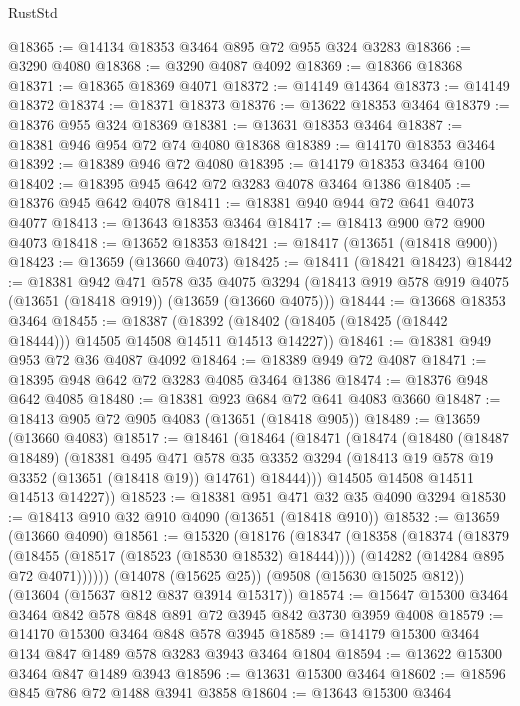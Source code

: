 \begin{lexlean}{RustStd}
\begin{coremodule}
@18365 := @14134 @18353 @3464 @895 @72 @955 @324 @3283
@18366 := @3290 @4080
@18368 := @3290 @4087 @4092
@18369 := @18366 @18368
@18371 := @18365 @18369 @4071
@18372 := @14149 @14364
@18373 := @14149 @18372
@18374 := @18371 @18373
@18376 := @13622 @18353 @3464
@18379 := @18376 @955 @324 @18369
@18381 := @13631 @18353 @3464
@18387 := @18381 @946 @954 @72 @74 @4080 @18368
@18389 := @14170 @18353 @3464
@18392 := @18389 @946 @72 @4080
@18395 := @14179 @18353 @3464 @100
@18402 := @18395 @945 @642 @72 @3283 @4078 @3464 @1386
@18405 := @18376 @945 @642 @4078
@18411 := @18381 @940 @944 @72 @641 @4073 @4077
@18413 := @13643 @18353 @3464
@18417 := @18413 @900 @72 @900 @4073
@18418 := @13652 @18353
@18421 := @18417 (@13651 (@18418 @900))
@18423 := @13659 (@13660 @4073)
@18425 := @18411 (@18421 @18423)
@18442 := @18381
    @942
    @471
    @578
    @35
    @4075
    @3294
    (@18413 @919 @578 @919 @4075 (@13651 (@18418 @919)) (@13659 (@13660 @4075)))
@18444 := @13668 @18353 @3464
@18455 := @18387
    (@18392 (@18402 (@18405 (@18425 (@18442 @18444))) @14505 @14508 @14511 @14513 @14227))
@18461 := @18381 @949 @953 @72 @36 @4087 @4092
@18464 := @18389 @949 @72 @4087
@18471 := @18395 @948 @642 @72 @3283 @4085 @3464 @1386
@18474 := @18376 @948 @642 @4085
@18480 := @18381 @923 @684 @72 @641 @4083 @3660
@18487 := @18413 @905 @72 @905 @4083 (@13651 (@18418 @905))
@18489 := @13659 (@13660 @4083)
@18517 := @18461
    (@18464
      (@18471
        (@18474
          (@18480
            (@18487 @18489)
            (@18381
              @495
              @471
              @578
              @35
              @3352
              @3294
              (@18413 @19 @578 @19 @3352 (@13651 (@18418 @19)) @14761)
              @18444)))
        @14505
        @14508
        @14511
        @14513
        @14227))
@18523 := @18381 @951 @471 @32 @35 @4090 @3294
@18530 := @18413 @910 @32 @910 @4090 (@13651 (@18418 @910))
@18532 := @13659 (@13660 @4090)
@18561 := @15320
    (@18176
      (@18347
        (@18358
          (@18374
            (@18379 (@18455 (@18517 (@18523 (@18530 @18532) @18444))))
            (@14282 (@14284 @895 @72 @4071))))))
    (@14078 (@15625 @25))
    (@9508 (@15630 @15025 @812))
    (@13604 (@15637 @812 @837 @3914 @15317))
@18574 := @15647 @15300 @3464 @3464 @842 @578 @848 @891 @72 @3945 @842 @3730 @3959 @4008
@18579 := @14170 @15300 @3464 @848 @578 @3945
@18589 := @14179 @15300 @3464 @134 @847 @1489 @578 @3283 @3943 @3464 @1804
@18594 := @13622 @15300 @3464 @847 @1489 @3943
@18596 := @13631 @15300 @3464
@18602 := @18596 @845 @786 @72 @1488 @3941 @3858
@18604 := @13643 @15300 @3464

\end{coremodule}
\end{lexlean}

